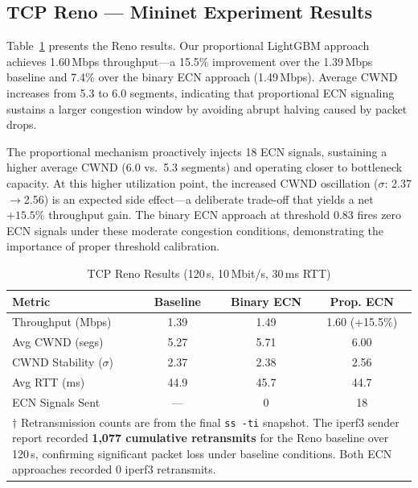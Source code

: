 \subsection{TCP Reno --- Mininet Experiment Results}

Table~\ref{tab:reno} presents the Reno results. Our proportional LightGBM approach achieves 1.60\,Mbps throughput---a 15.5\% improvement over the 1.39\,Mbps baseline and 7.4\% over the binary ECN approach (1.49\,Mbps). Average CWND increases from 5.3 to 6.0 segments, indicating that proportional ECN signaling sustains a larger congestion window by avoiding abrupt halving caused by packet drops.

The proportional mechanism proactively injects 18 ECN signals, sustaining a higher average CWND (6.0 vs.\ 5.3 segments) and operating closer to bottleneck capacity. At this higher utilization point, the increased CWND oscillation ($\sigma$: 2.37$\rightarrow$2.56) is an expected side effect---a deliberate trade-off that yields a net $+15.5\%$ throughput gain. The binary ECN approach at threshold 0.83 fires zero ECN signals under these moderate congestion conditions, demonstrating the importance of proper threshold calibration.

\begin{table}[!t]
\renewcommand{\arraystretch}{1.3}
\caption{TCP Reno Results (120\,s, 10\,Mbit/s, 30\,ms RTT)}
\label{tab:reno}
\centering
\begin{tabular}{lccc}
\toprule
\textbf{Metric} & \textbf{Baseline} & \textbf{Binary ECN} & \textbf{Prop. ECN} \\
\midrule
Throughput (Mbps)       & 1.39  & 1.49  & 1.60 (+15.5\%) \\
Avg CWND (segs)         & 5.27  & 5.71  & 6.00 \\
CWND Stability ($\sigma$) & 2.37 & 2.38 & 2.56 \\
Avg RTT (ms)            & 44.9  & 45.7  & 44.7 \\
ECN Signals Sent        & ---   & 0     & 18 \\
\bottomrule
\multicolumn{4}{p{0.95\columnwidth}}{%
$\dagger$ Retransmission counts are from the final \texttt{ss -ti} snapshot.
The iperf3 sender report recorded \textbf{1,077 cumulative retransmits} for
the Reno baseline over 120\,s, confirming significant packet loss under
baseline conditions. Both ECN approaches recorded 0 iperf3 retransmits.}
\end{tabular}
\end{table}

